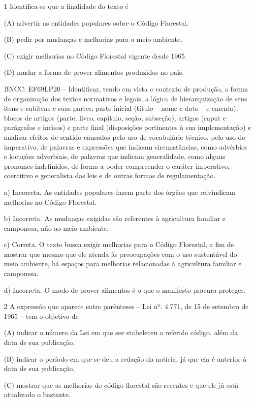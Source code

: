 \begin{itemize}
\begin{itemize}
\begin{escolha}
\begin{escolha}
\begin{escolha}
\begin{escolha}
\begin{escolha}
\num{1} Identifica-se que a finalidade do texto é

(A) advertir as entidades populares sobre o Código Florestal.

(B) pedir por mudanças e melhorias para o meio ambiente.

(C) exigir melhorias no Código Florestal vigente desde 1965.

(D) mudar a forma de prover alimentos produzidos no país.

BNCC: EF69LP20 -- Identificar, tendo em vista o contexto de produção, a
forma de organização dos textos normativos e legais, a lógica de
hierarquização de seus itens e subitens e suas partes: parte inicial
(título -- nome e data -- e ementa), blocos de artigos (parte, livro,
capítulo, seção, subseção), artigos (caput e parágrafos e incisos) e
parte final (disposições pertinentes à sua implementação) e analisar
efeitos de sentido causados pelo uso de vocabulário técnico, pelo uso do
imperativo, de palavras e expressões que indicam circunstâncias, como
advérbios e locuções adverbiais, de palavras que indicam generalidade,
como alguns pronomes indefinidos, de forma a poder compreender o caráter
imperativo, coercitivo e generalista das leis e de outras formas de
regulamentação.

a) Incorreta. As entidades populares fazem parte dos órgãos que
reivindicam melhorias no Código Florestal.

b) Incorreta. As mudanças exigidas são referentes à agricultura familiar
e camponesa, não ao meio ambiente.

c) Correta. O texto busca exigir melhorias para o Código Florestal, a
fim de mostrar que mesmo que ele atenda às preocupações com o uso
sustentável do meio ambiente, há espaços para melhorias relacionadas à
agricultura familiar e camponesa.

d) Incorreta. O modo de prover alimentos é o que o manifesto procura
proteger.

\num{2} A expressão que aparece entre parênteses -- Lei nº. 4.771, de 15
de setembro de 1965 -- tem o objetivo de

(A) indicar o número da Lei em que see stabeleceu o referido código,
além da data de sua publicação.

(B) indicar o período em que se deu a redação da notícia, já que ela é
anterior à data de sua publicação.

(C) mostrar que as melhorias do código florestal são recentes e que ele
já está atualizado o bastante.


\end{escolha}
\end{escolha}
\end{escolha}
\end{escolha}
\end{escolha}
\end{itemize}
\end{itemize}

